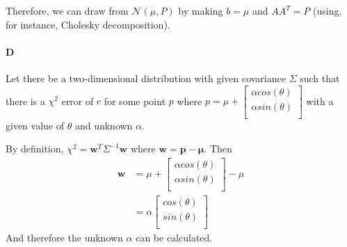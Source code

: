 \documentclass[12pt]{article}
\begin{document}
Therefore, we can draw from $\mathcal{N}\left(\mu,P\right)$ by making $b=\mu$ and $AA^T=P$ (using, for instance, Cholesky decomposition).

\paragraph{D}
Let there be a two-dimensional distribution with given covariance $\Sigma$ such that there is a $\chi^2$ error of $c$ for some point $p$ where $p = \mu +
\left[ {\begin{smallmatrix}
\alpha cos(\theta)  \\
\alpha sin(\theta)  \\
 \end{smallmatrix} } \right]$
with a given value of $\theta$ and unknown $\alpha$.

By definition, $\chi^2 = \mathbf{w}^T \Sigma^{-1} \mathbf{w}$ where $\mathbf{w} = \mathbf{p}-\mathbf{\mu}$.  Then
\begin{align*}
\mathbf{w} &= \mu +
	\left[ {\begin{smallmatrix}
	\alpha cos(\theta)  \\
	\alpha sin(\theta)  \\
 	\end{smallmatrix} } \right]
	- \mu \\
 &= \alpha \left[ {\begin{smallmatrix}
	cos(\theta)  \\
	sin(\theta)  \\
	 \end{smallmatrix} } \right]
\end{align*}
And therefore the unknown $\alpha$ can be calculated.
\end{document}
